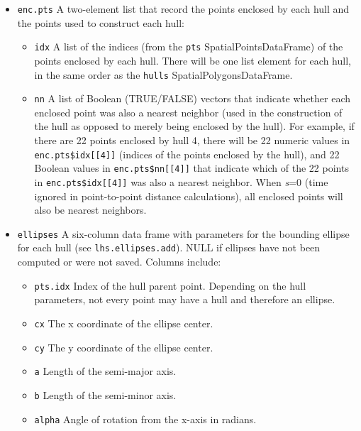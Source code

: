 \documentclass{article}
\begin{document}
\begin{itemize}
\item \texttt{enc.pts} A two-element list that record the points enclosed by each hull and the points used to construct each hull:
    \begin{itemize}  
      \item \texttt{idx} A list of the indices (from the \texttt{pts} SpatialPointsDataFrame) of the points enclosed by each hull. There will be one list element for each hull, in the same order as the \texttt{hulls} SpatialPolygonsDataFrame. 
      \item \texttt{nn} A list of Boolean (TRUE/FALSE) vectors that indicate whether each enclosed point was also a nearest neighbor (used in the construction of the hull as opposed to merely being enclosed by the hull). For example, if there are 22 points enclosed by hull 4, there will be 22 numeric values in \texttt{enc.pts\$idx[[4]]} (indices of the points enclosed by the hull), and 22 Boolean values in \texttt{enc.pts\$nn[[4]]} that indicate which of the 22 points in \texttt{enc.pts\$idx[[4]]} was also a nearest neighbor. When \textit{s}=0 (time ignored in point-to-point distance calculations), all enclosed points will also be nearest neighbors.
    \end{itemize}  

  \item \texttt{ellipses} A six-column data frame with parameters for the bounding ellipse for each hull (see \texttt{lhs.ellipses.add}). NULL if ellipses have not been computed or were not saved. Columns include:
    \begin{itemize}
      \item \texttt{pts.idx} Index of the hull parent point. Depending on the hull parameters, not every point may have a hull and therefore an ellipse. 
      \item \texttt{cx} The x coordinate of the ellipse center.
      \item \texttt{cy} The y coordinate of the ellipse center.
      \item \texttt{a} Length of the semi-major axis.
      \item \texttt{b} Length of the semi-minor axis.
      \item \texttt{alpha} Angle of rotation from the x-axis in radians.
    \end{itemize}



\end{itemize}
\end{document}
